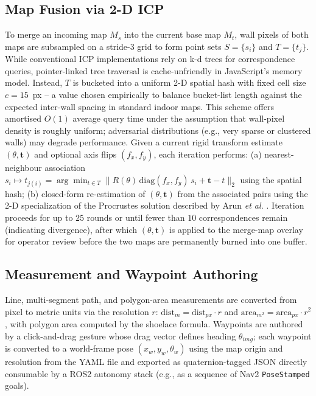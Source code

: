 \documentclass{IEEE_lsens}
\begin{document}
\subsection{Map Fusion via 2-D ICP}
To merge an incoming map $M_s$ into the current base map $M_t$, wall pixels of both maps are subsampled on a stride-3 grid to form point sets $S=\{s_i\}$ and $T=\{t_j\}$. While conventional ICP \cite{besl1992method} implementations rely on k-d trees for correspondence queries, pointer-linked tree traversal is cache-unfriendly in JavaScript's memory model. Instead, $T$ is bucketed into a uniform 2-D spatial hash with fixed cell size $c=15$~px -- a value chosen empirically to balance bucket-list length against the expected inter-wall spacing in standard indoor maps. This scheme offers amortised $O(1)$ average query time under the assumption that wall-pixel density is roughly uniform; adversarial distributions (e.g., very sparse or clustered walls) may degrade performance. Given a current rigid transform estimate $(\theta, \mathbf{t})$ and optional axis flips $(f_x,f_y)$, each iteration performs: (a) nearest-neighbour association $s_i \mapsto t_{j(i)} = \arg\min_{t\in T} \lVert R(\theta)\,\mathrm{diag}(f_x,f_y)\,s_i + \mathbf{t} - t\rVert_2$ using the spatial hash; (b) closed-form re-estimation of $(\theta,\mathbf{t})$ from the associated pairs using the 2-D specialization of the Procrustes solution described by Arun \emph{et al.} \cite{arun1987least}. Iteration proceeds for up to $25$ rounds or until fewer than $10$ correspondences remain (indicating divergence), after which $(\theta,\mathbf{t})$ is applied to the merge-map overlay for operator review before the two maps are permanently burned into one buffer.

\subsection{Measurement and Waypoint Authoring}
Line, multi-segment path, and polygon-area measurements are converted from pixel to metric units via the resolution $r$: $\text{dist}_m = \text{dist}_{px}\cdot r$ and $\text{area}_{m^2} = \text{area}_{px}\cdot r^2$, with polygon area computed by the shoelace formula. Waypoints are authored by a click-and-drag gesture whose drag vector defines heading $\theta_{img}$; each waypoint is converted to a world-frame pose $(x_w, y_w, \theta_w)$ using the map origin and resolution from the YAML file and exported as quaternion-tagged JSON directly consumable by a ROS2 autonomy stack (e.g., as a sequence of Nav2 \texttt{PoseStamped} goals).
\end{document}
